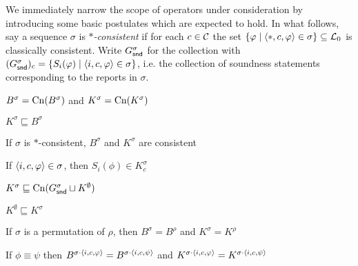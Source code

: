We immediately narrow the scope of operators under consideration by introducing
some basic postulates which are expected to hold. In what follows, say a
sequence $\sigma$ is \emph{$\ast$-consistent} if for each $c \in \mathcal{C}$ the set
$\{\varphi \mid \langle {\ast, c, \varphi} \rangle \in \sigma\} \subseteq \mathcal{L}{}_0$ is
classically consistent. Write $G^\sigma_{\mathsf{snd}}$ for the collection with
$(G^\sigma_{\mathsf{snd}})_c = \{S_i(\varphi) \mid \langle {i, c, \varphi} \rangle \in \sigma\}$, i.e.
the collection of soundness statements corresponding to the reports in
$\sigma$.

\begin{postulate}[\closure{}]
    $B^\sigma = \operatorname{Cn}(B^\sigma)$ and  $K^\sigma = \operatorname{Cn}(K^\sigma)$
\end{postulate}
\begin{postulate}[\containment{}]
    $K^\sigma \sqsubseteq B^\sigma$
\end{postulate}
\begin{postulate}[\consistency{}]
    If $\sigma$ is $\ast$-consistent, $B^\sigma$ and $K^\sigma$ are
    consistent
\end{postulate}
\begin{postulate}[\soundness{}]
    If $\langle {i, c, \varphi} \rangle \in \sigma$, then $S_i(\phi) \in K^\sigma_c$
\end{postulate}
\begin{postulate}[\kbound{}]
    $K^\sigma \sqsubseteq \operatorname{Cn}(G^\sigma_{\mathsf{snd}} \sqcup K^\emptyset)$
\end{postulate}
\begin{postulate}[\priorext{}]
    $K^\emptyset \sqsubseteq K^\sigma$
\end{postulate}
\begin{postulate}[\rearr{}]
    If $\sigma$ is a permutation of $\rho$, then $B^\sigma = B^\rho$ and
    $K^\sigma = K^\rho$
\end{postulate}
\begin{postulate}[\equivpost{}]
    If $\phi \equiv \psi$ then $B^{\sigma \cdot \langle {i, c, \varphi} \rangle} = B^{\sigma
    \cdot \langle {i, c, \psi} \rangle}$ and $K^{\sigma \cdot \langle {i, c, \varphi} \rangle} =
    K^{\sigma \cdot \langle {i, c, \psi} \rangle}$
\end{postulate}

